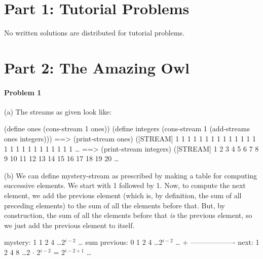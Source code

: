 
                                




\medskip

\section{Part 1: Tutorial Problems}

No written solutions are distributed for tutorial problems. 

\section{Part 2: The Amazing Owl}

\paragraph{Problem 1}

(a) The streams as given look like:

\beginlisp
(define ones     (cons-stream 1 ones))
(define integers (cons-stream 1 (add-streams ones integers)))
\null
==> (print-stream ones)
([STREAM] 1 1 1 1 1 1 1 1 1 1 1 1 1 1 1 1 1 1 1 1 1 1 1 1 1 1 \ldots
\null
==> (print-stream integers)
([STREAM] 1 2 3 4 5 6 7 8 9 10 11 12 13 14 15 16 17 18 19 20 \ldots
\endlisp

(b) We can define {\cf mystery-stream} as prescribed by making a table for
computing successive elements. We start with 1 followed by 1. Now, to compute
the next element, we add the previous element (which is, by definition, the sum
of all preceding elements) to the sum of all the elements before that. But, by
construction, the sum of all the elements before that {\it is\/} the previous
element, so we just add the previous element to itself.

\beginlisp
mystery:        1 1 2 4 \ldots 2$^{i-2}$ \ldots
sum previous:   0 1 2 4 \ldots 2$^{i-2}$ \ldots
             + -------------------
next:           1 2 4 8 \ldots 2 $\cdot$ 2$^{i-2}$ = 2$^{i-2+1}$ \ldots
\endlisp

